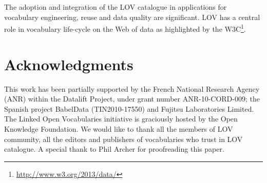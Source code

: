 \documentclass{iosart2c}
\begin{document}
The adoption and integration of the LOV catalogue in applications for vocabulary engineering, reuse and data quality are significant. LOV has a central role in vocabulary life-cycle on the Web of data as highlighted by the W3C\footnote{\url{http://www.w3.org/2013/data/}}. 


\section*{Acknowledgments}
This work has been partially supported by the French National Research Agency (ANR) within the Datalift Project, under grant number ANR-10-CORD-009; the Spanish project BabelData (TIN2010-17550) and Fujitsu Laboratories Limited. The Linked Open Vocabularies initiative is graciously hosted by the Open Knowledge Foundation. We would like to thank all the members of LOV community, all the editors and publishers of vocabularies who trust in LOV catalogue. A special thank to Phil Archer for proofreading this paper. 



\end{document}
